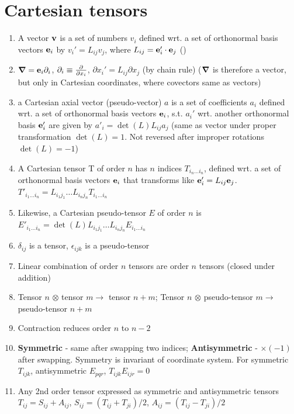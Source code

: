 \documentclass{article}
\theoremstyle{remark}
\theoremstyle{remark}
\begin{document}
\section*{Cartesian tensors}
    \begin{enumerate}
        \item A vector $\vb{v}$ is a set of numbers $v_i$ defined wrt. a set of orthonormal basis vectors $\vb{e}_i$ by $\boxed{v_i'=L_{ij}v_j}$, where $L_{ij}=\vb{e}_i'\cdot\vb{e}_j$ ()
        \item $\grad=\vb{e}_i\partial_i$, $\partial_i\equiv\pdv{x_i}$, $\partial{x_i'}=L_{ij}\partial{x_j}$ (by chain rule) ($\grad$ is therefore a vector, but only in Cartesian coordinates, where covectors same as vectors)
        \item a Cartesian axial vector (pseudo-vector) $a$ is a set of coefficients $a_i$ defined wrt. a set of orthonormal basis vectors $\vb{e}_i$, s.t. $a_i'$ wrt. another orthonormal basis $\vb{e}_i'$ are given by $a'_i=\det(L)L_{ij}a_j$ (same as vector under proper transformation $\det(L)=1$. Not reversed after improper rotations $\det(L)=-1$)
        \item A Cartesian tensor T of order $n$ has $n$ indices $T_{i_n\ldots i_n}$, defined wrt. a set of orthonormal basis vectors $\vb{e}_i$ that transforms like $\vb{e}_i'=L_{ij}\vb{e}_j$. $\boxed{T'_{i_1\ldots i_n}=L_{i_1j_1}\ldots L_{i_n j_n}T_{i_1\ldots i_n}}$
        \item Likewise, a Cartesian pseudo-tensor $E$ of order $n$ is $\boxed{E'_{i_1\ldots i_n}=\det(L)L_{i_1j_1}\ldots L_{i_n j_n}E_{i_1\ldots i_n}}$
        \item $\delta_{ij}$ is a tensor, $\epsilon_{ijk}$ is a pseudo-tensor
        \item Linear combination of order $n$ tensors are order $n$ tensors (closed under addition)
        \item Tensor $n$ $\otimes$ tensor $m\rightarrow$ tensor $n+m$; Tensor $n$ $\otimes$ pseudo-tensor $m\rightarrow$ pseudo-tensor $n+m$
        \item Contraction reduces order $n$ to $n-2$
        \item \textbf{Symmetric} - same after swapping two indices; \textbf{Antisymmetric} - $\times(-1)$ after swapping. Symmetry is invariant of coordinate system. For symmetric $T_{ijk}$, antisymmetric $E_{pqr}$, \newline
        $T_{ijk}E_{ijr}=0$
        \item Any 2nd order tensor expressed as symmetric and antisymmetric tensors $T_{ij}=S_{ij}+A_{ij}$, $S_{ij}=(T_{ij}+T_{ji})/2$, $A_{ij}=(T_{ij}-T_{ji})/2$

\end{enumerate}
\end{document}

